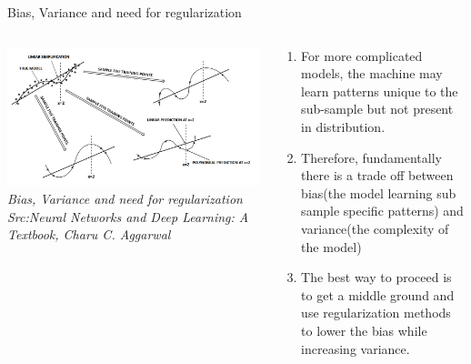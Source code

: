 \begin{frame}{Bias, Variance and need for regularization}
	\begin{columns}[T]
        \begin{column}{0.4\textwidth}
        	\includegraphics[width=\textwidth]{images/overfit and underfit.png}
			\tiny{\textit{Bias, Variance and need for regularization\\Src:Neural Networks and Deep Learning: A Textbook, Charu C. Aggarwal  }}
        \end{column}
		\begin{column}{0.6\textwidth}
			\begin{enumerate}[$\bullet$]
				\item For more complicated models, the machine may learn patterns unique to the sub-sample but not present in distribution.\pause
				\item Therefore, fundamentally there is a trade off between bias(the model learning sub sample specific patterns) and variance(the complexity of the model)\pause
				\item The best way to proceed is to get a middle ground and use regularization methods to lower the bias while increasing variance.
			\end{enumerate}
		\end{column} 
    \end{columns}
\end{frame}

